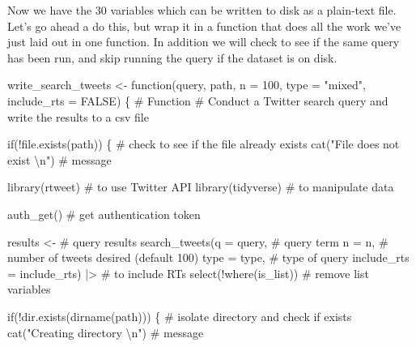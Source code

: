 \documentclass[
  letterpaper,
]{latex/krantz}
\newenvironment{Shaded}{\begin{snugshade}}{\end{snugshade}}
\newcommand{\AttributeTok}[1]{\textcolor[rgb]{0.40,0.45,0.13}{#1}}
\newcommand{\CommentTok}[1]{\textcolor[rgb]{0.37,0.37,0.37}{#1}}
\newcommand{\ConstantTok}[1]{\textcolor[rgb]{0.56,0.35,0.01}{#1}}
\newcommand{\ControlFlowTok}[1]{\textcolor[rgb]{0.00,0.23,0.31}{#1}}
\newcommand{\DecValTok}[1]{\textcolor[rgb]{0.68,0.00,0.00}{#1}}
\newcommand{\FunctionTok}[1]{\textcolor[rgb]{0.28,0.35,0.67}{#1}}
\newcommand{\NormalTok}[1]{\textcolor[rgb]{0.00,0.23,0.31}{#1}}
\newcommand{\OtherTok}[1]{\textcolor[rgb]{0.00,0.23,0.31}{#1}}
\newcommand{\SpecialCharTok}[1]{\textcolor[rgb]{0.37,0.37,0.37}{#1}}
\newcommand{\StringTok}[1]{\textcolor[rgb]{0.13,0.47,0.30}{#1}}
\begin{document}
Now we have the 30 variables which can be written to disk as a
plain-text file. Let's go ahead a do this, but wrap it in a function
that does all the work we've just laid out in one function. In addition
we will check to see if the same query has been run, and skip running
the query if the dataset is on disk.

\begin{Shaded}
\begin{Highlighting}[]
\NormalTok{write\_search\_tweets }\OtherTok{\textless{}{-}} 
  \ControlFlowTok{function}\NormalTok{(query, path, }\AttributeTok{n =} \DecValTok{100}\NormalTok{, }\AttributeTok{type =} \StringTok{"mixed"}\NormalTok{, }\AttributeTok{include\_rts =} \ConstantTok{FALSE}\NormalTok{) \{}
    \CommentTok{\# Function}
    \CommentTok{\# Conduct a Twitter search query and write the results to a csv file}
    
    \ControlFlowTok{if}\NormalTok{(}\SpecialCharTok{!}\FunctionTok{file.exists}\NormalTok{(path)) \{ }\CommentTok{\# check to see if the file already exists}
      \FunctionTok{cat}\NormalTok{(}\StringTok{"File does not exist }\SpecialCharTok{\textbackslash{}n}\StringTok{"}\NormalTok{) }\CommentTok{\# message}
      
      \FunctionTok{library}\NormalTok{(rtweet) }\CommentTok{\# to use Twitter API}
      \FunctionTok{library}\NormalTok{(tidyverse) }\CommentTok{\# to manipulate data}
      
      \FunctionTok{auth\_get}\NormalTok{() }\CommentTok{\# get authentication token}
      
\NormalTok{      results }\OtherTok{\textless{}{-}} \CommentTok{\# query results}
        \FunctionTok{search\_tweets}\NormalTok{(}\AttributeTok{q =}\NormalTok{ query, }\CommentTok{\# query term}
                      \AttributeTok{n =}\NormalTok{ n, }\CommentTok{\# number of tweets desired (default 100)}
                      \AttributeTok{type =}\NormalTok{ type, }\CommentTok{\# type of query}
                      \AttributeTok{include\_rts =}\NormalTok{ include\_rts) }\SpecialCharTok{|\textgreater{}}  \CommentTok{\# to include RTs}
        \FunctionTok{select}\NormalTok{(}\SpecialCharTok{!}\FunctionTok{where}\NormalTok{(is\_list))  }\CommentTok{\# remove list variables}
      
      \ControlFlowTok{if}\NormalTok{(}\SpecialCharTok{!}\FunctionTok{dir.exists}\NormalTok{(}\FunctionTok{dirname}\NormalTok{(path))) \{ }\CommentTok{\# isolate directory and check if exists}
        \FunctionTok{cat}\NormalTok{(}\StringTok{"Creating directory }\SpecialCharTok{\textbackslash{}n}\StringTok{"}\NormalTok{) }\CommentTok{\# message}
        

\end{Highlighting}
\end{Shaded}
\end{document}
